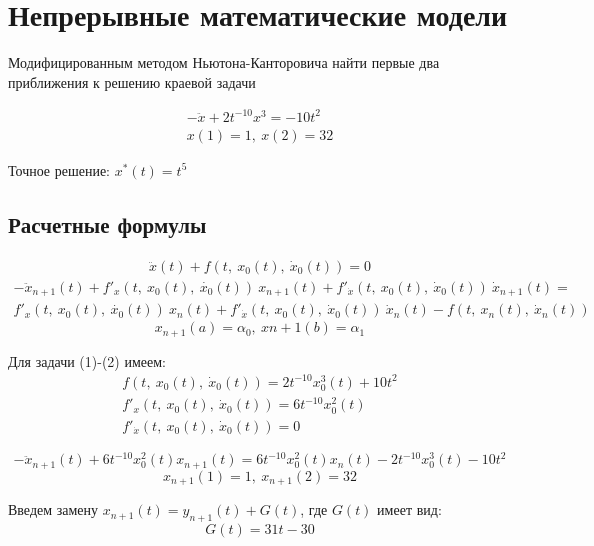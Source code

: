 \documentclass[12pt]{article}
\begin{document}
\section*{Непрерывные математические модели}

Модифицированным методом Ньютона-Канторовича найти первые два приближения к решению краевой задачи

\begin{gather}
	-\ddot{x} + 2t^{-10}x^3 = -10t^2 \\
	x(1)=1,\ x(2)=32
\end{gather}

Точное решение: $x^*(t) = t^5$

\subsection*{Расчетные формулы}



\begin{gather}
\ddot{x}(t) + f(t,\ x_0(t),\ \dot{x}_0(t)) = 0
\end{gather}
\begin{multline}
	-\ddot{x}_{n+1}(t) + f'_x(t,\ x_0(t),\ \dot{x_0}(t))\ x_{n+1}(t) +
	f'_{\dot{x}}(t,\ x_0(t),\ \dot{x}_0(t))\ \dot{x}_{n+1}(t) = \\
	f'_x(t,\ x_0(t),\ \dot{x_0}(t))\ x_n(t) +
	f'_{\dot{x}}(t,\ x_0(t),\ \dot{x}_0(t))\ \dot{x}_n(t) -
	f(t,\ x_n(t),\ \dot{x}_n(t))
\end{multline}
\begin{equation}
	x_{n+1}(a) = \alpha_0,\ x{n+1}(b) = \alpha_1
\end{equation}

Для задачи (1)-(2) имеем:
\begin{gather*}
	f(t,\ x_0(t),\ \dot{x}_0(t)) = 2t^{-10}x^3_0(t) + 10t^2 \\
	f'_x(t,\ x_0(t),\ \dot{x}_0(t)) = 6t^{-10}x^2_0(t) \\
	f'_{\dot{x}}(t,\ x_0(t),\ \dot{x}_0(t)) = 0
\end{gather*}

\begin{equation}
-\ddot{x}_{n+1}(t) + 6t^{-10}x^2_0(t)x_{n+1}(t) =
 6t^{-10}x^2_0(t)x_n(t) - 2t^{-10}x^3_0(t) - 10t^2
\end{equation}
\begin{equation}
x_{n+1}(1)=1,\ x_{n+1}(2)=32
\end{equation}

Введем замену $x_{n+1}(t) = y_{n+1}(t) + G(t)$, где $G(t)$ имеет вид:
\begin{equation}
G(t) = 31t - 30
\end{equation}
\end{document}
